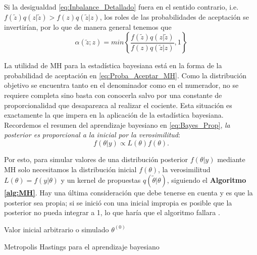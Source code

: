 Si la desigualdad \eqref{eq:Inbalance_Detallado} fuera en el sentido contrario, i.e. $f(\tilde{z})q(z|\tilde{z})>f(z)q(\tilde{z}|z)$, los roles de las probabilidades de aceptación se invertirían, por lo que de manera general tenemos que 
\begin{equation}
\label{eq:Proba_Aceptar_MH}
\alpha(\tilde{z};z)=min\left\lbrace\dfrac{f(\tilde{z})q(z|\tilde{z})}{f(z)q(\tilde{z}|z)},1\right\rbrace
\end{equation}

La utilidad de MH para la estadística bayesiana está en la forma de la probabilidad de aceptación en \eqref{eq:Proba_Aceptar_MH}. Como la distribución objetivo se encuentra tanto en el denominador como en el numerador, no se requiere completa sino basta con conocerla salvo por una constante de proporcionalidad que desaparezca al realizar el cociente. Esta situación es exactamente la que impera en la aplicación de la estadística bayesiana. Recordemos el resumen del aprendizaje bayesiano en \eqref{eq:Bayes_Prop}, \textit{la posterior es proporcional a la inicial por la verosimilitud}: 
\begin{equation*}
f(\theta|y) \propto L(\theta)f(\theta).
\end{equation*}

Por esto, para simular valores de una distribución posterior $f(\theta|y)$ mediante MH solo necesitamos la distribución inicial $f(\theta)$, la verosimilitud $L(\theta)=f(y|\theta)$ y un kernel de propuestas $q(\tilde{\theta}|\theta)$, siguiendo el \textbf{Algoritmo \ref{alg:MH}}. Hay una última consideración que debe tenerse en cuenta y es que la posterior sea propia; si se inició con una inicial impropia es posible que la posterior no pueda integrar a 1, lo que haría que el algoritmo fallara \parencite{RobertCasella10}.\\

\begin{algorithm}
\DontPrintSemicolon
Valor inicial arbitrario o simulado $\theta^{(0)}$\;

\caption{Metropolis Hastings para el aprendizaje bayesiano \label{alg:MH}}
\end{algorithm}

